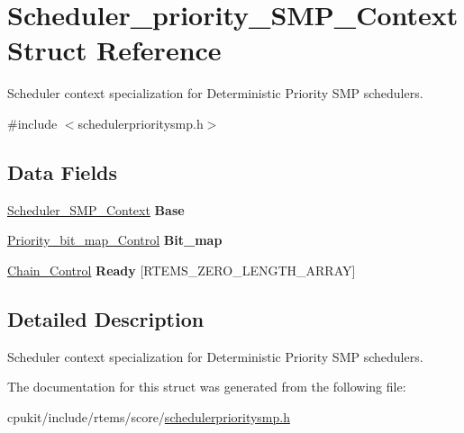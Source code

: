\hypertarget{structScheduler__priority__SMP__Context}{}\section{Scheduler\+\_\+priority\+\_\+\+S\+M\+P\+\_\+\+Context Struct Reference}
\label{structScheduler__priority__SMP__Context}


Scheduler context specialization for Deterministic Priority S\+MP schedulers.  




{\ttfamily \#include $<$schedulerprioritysmp.\+h$>$}

\subsection*{Data Fields}
\begin{DoxyCompactItemize}
\item 
\mbox{\label{structScheduler__priority__SMP__Context_a0da682a6d1038ed8b72fe06b3a1b32dd}} 
\mbox{\hyperlink{structScheduler__SMP__Context}{Scheduler\+\_\+\+S\+M\+P\+\_\+\+Context}} {\bfseries Base}
\item 
\mbox{\label{structScheduler__priority__SMP__Context_a5658a9d12e70eaf25941d70d801a6e1a}} 
\mbox{\hyperlink{structPriority__bit__map__Control}{Priority\+\_\+bit\+\_\+map\+\_\+\+Control}} {\bfseries Bit\+\_\+map}
\item 
\mbox{\label{structScheduler__priority__SMP__Context_a8d467956daac6720c250cf1cc20c8a3b}} 
\mbox{\hyperlink{unionChain__Control}{Chain\+\_\+\+Control}} {\bfseries Ready} \mbox{[}R\+T\+E\+M\+S\+\_\+\+Z\+E\+R\+O\+\_\+\+L\+E\+N\+G\+T\+H\+\_\+\+A\+R\+R\+AY\mbox{]}
\end{DoxyCompactItemize}


\subsection{Detailed Description}
Scheduler context specialization for Deterministic Priority S\+MP schedulers. 

The documentation for this struct was generated from the following file\+:\begin{DoxyCompactItemize}
\item 
cpukit/include/rtems/score/\mbox{\hyperlink{schedulerprioritysmp_8h}{schedulerprioritysmp.\+h}}\end{DoxyCompactItemize}
